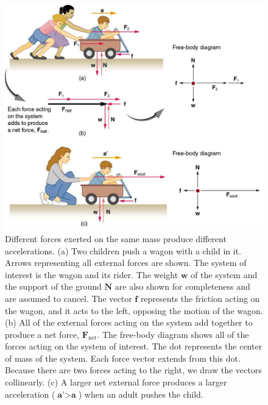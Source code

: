 \documentclass[
]{book}
\begin{document}
\begin{figure}
\hypertarget{import-auto-id1993910}{%
\centering
\includegraphics{images/Figure 04_03_01.jpg}
\caption{Different forces exerted on the same mass produce different
accelerations. (a) Two children push a wagon with a child in it. Arrows
representing all external forces are shown. The system of interest is
the wagon and its rider. The weight \(\textbf{w}{}\) of the system and the
support of the ground \(\textbf{N}{}\) are also shown for completeness and
are assumed to cancel. The vector \(\textbf{f}{}\) represents the friction
acting on the wagon, and it acts to the left, opposing the motion of the
wagon. (b) All of the external forces acting on the system add together
to produce a net force, \(\textbf{F}_{\text{net}}{}\). The free-body
diagram shows all of the forces acting on the system of interest. The
dot represents the center of mass of the system. Each force vector
extends from this dot. Because there are two forces acting to the right,
we draw the vectors collinearly. (c) A larger net external force
produces a larger acceleration (\(\textbf{a'} > \textbf{a}\)) when an
adult pushes the
child.}\label{import-auto-id1993910}
}
\end{figure}
\end{document}
